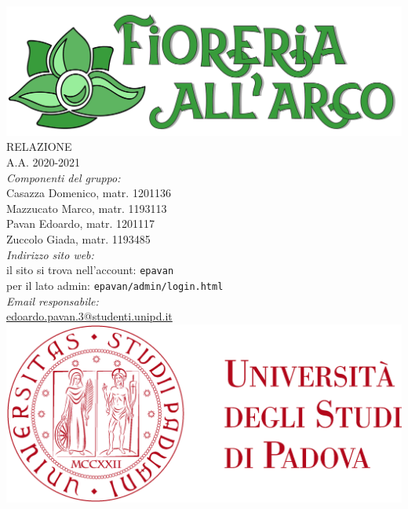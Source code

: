 \thispagestyle{empty}
\begin{titlepage}
	\begin{center}
		
		\includegraphics[scale = 0.05]{../latex/images/logotitle.png}\\[1.5cm]
\Huge \textsc{RELAZIONE \doctitle{}}\\ [0.75cm]                          
\Large \textsf{A.A. 2020-2021} \\ [1cm]
		

\Large \textsl{Componenti del gruppo:} \\[0.25cm] \textsf{Casazza Domenico, matr. 1201136} \\ [0.1cm]
\Large \textsf{Mazzucato Marco, matr. 1193113} \\ [0.1cm]
\Large \textsf{Pavan Edoardo, matr. 1201117} \\ [0.1cm]
\Large \textsf{Zuccolo Giada, matr. 1193485} \\ [1cm]
                
\Large \textsl{Indirizzo sito web:} \\ \textsf{il sito si trova nell'account:} \texttt{epavan} \\ \textsf{per il lato admin:} \texttt{epavan/admin/login.html}\\[0.25cm]
\Large \textsl{Email responsabile:}\\ 
\textsf{\href{edoardo.pavan.3@studenti.unipd.it}{edoardo.pavan.3@studenti.unipd.it}}\\[1cm]

		\includegraphics[scale = 0.055]{../latex/images/logoUniPD.png}


	\end{center}
\end{titlepage}
